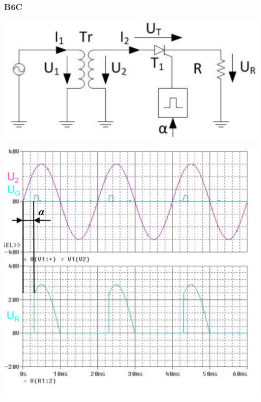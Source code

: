 \subsubsection{B6C}%
\vspace{-0.5cm}
\begin{minipage}{0.4\linewidth}
    \includegraphics[width=\linewidth]{images/GRM1c}
\end{minipage}
\begin{minipage}{0.35\linewidth}
    \centering 
    \includegraphics[width=\linewidth]{images/M1CKl}
    
\end{minipage}
